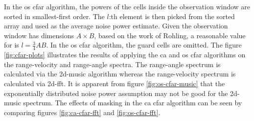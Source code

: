In the \gls{os} \gls{cfar} algorithm, the powers of the cells inside the observation window are sorted in smallest-first order.
The $l$:th element is then picked from the sorted array and used as the average noise power estimate.
Given the observation window has dimensions $A \times B$, based on the work of Rohling, a reasonable value for is $l = \frac{3}{4}AB$.
In the \gls{os} \gls{cfar} algorithm, the guard cells are omitted.
\cite{radar-cfar-thresholding-in-clitter-and-multiple-target-situations}
The figure \ref{fig:cfar-plots} illustrates the results of applying the \gls{ca} and \gls{os} \gls{cfar} algorithms
on the range-velocity and range-angle spectra. The range-angle spectrum is calculated via the \gls{2d-music} algorithm whereas the range-velocity
spectrum is calculated via \gls{2d-fft}.
It is apparent from figure \ref{fig:os-cfar-music} that the exponentially distributed noise power assumption may not be good for the \gls{2d-music} spectrum.
The effects of masking in the \gls{ca} \gls{cfar} algorithm can be seen by comparing figures \ref{fig:ca-cfar-fft} and \ref{fig:os-cfar-fft}.

